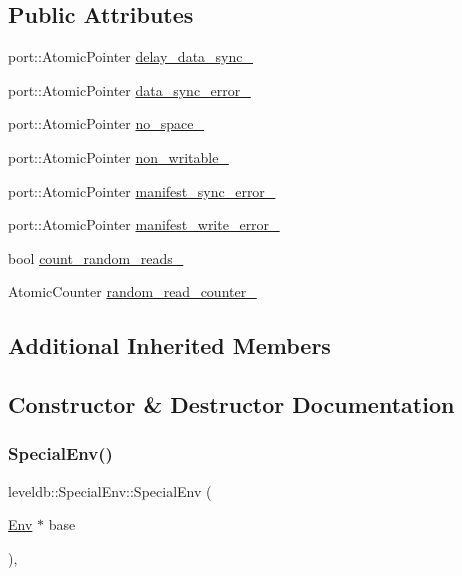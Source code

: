 \subsection*{Public Attributes}
\begin{DoxyCompactItemize}
\item 
port\+::\+Atomic\+Pointer \mbox{\hyperlink{classleveldb_1_1_special_env_af8a6a4d77f11f6986cb1d00f3cf9d37a}{delay\+\_\+data\+\_\+sync\+\_\+}}
\item 
port\+::\+Atomic\+Pointer \mbox{\hyperlink{classleveldb_1_1_special_env_ae468cdabd36e0b9fde534bb25a47499f}{data\+\_\+sync\+\_\+error\+\_\+}}
\item 
port\+::\+Atomic\+Pointer \mbox{\hyperlink{classleveldb_1_1_special_env_a21c9400bf22bd43f75349677b4d3413b}{no\+\_\+space\+\_\+}}
\item 
port\+::\+Atomic\+Pointer \mbox{\hyperlink{classleveldb_1_1_special_env_a3ecf4339c101366198febb32cfe938f0}{non\+\_\+writable\+\_\+}}
\item 
port\+::\+Atomic\+Pointer \mbox{\hyperlink{classleveldb_1_1_special_env_a354d87bbdeb456c36877e506872bcc04}{manifest\+\_\+sync\+\_\+error\+\_\+}}
\item 
port\+::\+Atomic\+Pointer \mbox{\hyperlink{classleveldb_1_1_special_env_a7a6fafc967db1ba7594676d372b7fbec}{manifest\+\_\+write\+\_\+error\+\_\+}}
\item 
bool \mbox{\hyperlink{classleveldb_1_1_special_env_aaf50860248689bda9993dfdcfb53855a}{count\+\_\+random\+\_\+reads\+\_\+}}
\item 
Atomic\+Counter \mbox{\hyperlink{classleveldb_1_1_special_env_a7cf0b2e4dcd63460e8776ae3a2c70bee}{random\+\_\+read\+\_\+counter\+\_\+}}
\end{DoxyCompactItemize}
\subsection*{Additional Inherited Members}


\subsection{Constructor \& Destructor Documentation}
\mbox{\label{classleveldb_1_1_special_env_a29fed9502e35a1f9374e0f46f4bd1181}} 
\subsubsection{\texorpdfstring{SpecialEnv()}{SpecialEnv()}}
{\footnotesize\ttfamily leveldb\+::\+Special\+Env\+::\+Special\+Env (\begin{DoxyParamCaption}\item[{\mbox{\hyperlink{classleveldb_1_1_env}{Env}} $\ast$}]{base }\end{DoxyParamCaption})\hspace{0.3cm}{\ttfamily [inline]}, {\ttfamily [explicit]}}




